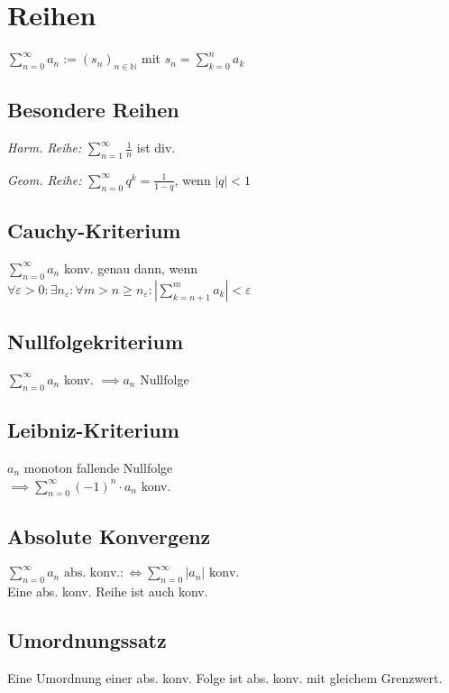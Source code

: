 \section*{Reihen}

$\displaystyle \sum_{n=0}^\infty a_n := (s_n)_{n\in\mathbb{N}}$ mit
$\displaystyle s_n = \sum_{k=0}^n a_k$

\subsection*{Besondere Reihen}

\textit{Harm. Reihe:}
$\displaystyle \sum_{n=1}^\infty\frac{1}{n}$ ist div.

\textit{Geom. Reihe:}
$\displaystyle \sum_{n=0}^\infty q^k = \frac{1}{1-q}$, wenn $|q|<1$

\subsection*{Cauchy-Kriterium}
$\displaystyle \sum_{n=0}^\infty a_n$ konv. genau dann, wenn \\
$\displaystyle \forall \varepsilon>0: \exists n_\varepsilon: \forall m>n\ge n_\varepsilon: \left|\sum_{k=n+1}^m a_k\right|<\varepsilon$

\subsection*{Nullfolgekriterium}
$\displaystyle \sum_{n=0}^\infty a_n$ konv. $\implies a_n$ Nullfolge

\subsection*{Leibniz-Kriterium}
$a_n$ monoton fallende Nullfolge \\
$\displaystyle \implies \sum_{n=0}^\infty (-1)^n\cdot a_n$ konv.

\subsection*{Absolute Konvergenz}
$\displaystyle \sum_{n=0}^\infty a_n \text{ abs. konv.} :\iff \sum_{n=0}^\infty|a_n| \text{ konv.}$ \\
Eine abs. konv. Reihe ist auch konv.

\subsection*{Umordnungssatz}
Eine Umordnung einer abs. konv. Folge ist abs. konv. mit gleichem Grenzwert.

